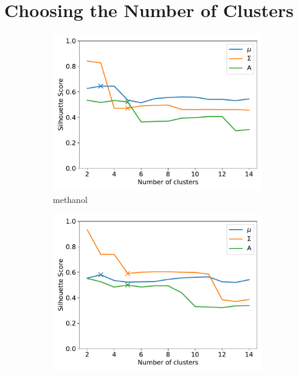 \documentclass{article}
\begin{document}
  \newpage
  
  \section{Choosing the Number of Clusters}\label{section:nclusters}
  
  \begin{figure}[h]
  \centering
  \begin{subfigure}{0.45\textwidth}
  \includegraphics[width=\textwidth]{silhouette_MET.pdf}
  \caption{methanol}\label{fig:silhouette_MET}
  \end{subfigure}
  \begin{subfigure}{0.45\textwidth}
  \includegraphics[width=\textwidth]{silhouette_URE.pdf}

\end{subfigure}
\end{figure}
\end{document}
